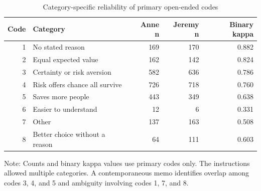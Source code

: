 \begin{table}[H]
\centering
\caption{\label{tab:open-ended-categories}Category-specific reliability of primary open-ended codes}
\centering
\fontsize{9}{11}\selectfont
\begin{threeparttable}
\begin{tabular}[t]{rlrrr}
\toprule
Code & Category & Anne n & Jeremy n & Binary kappa\\
\midrule
1 & No stated reason & 169 & 170 & 0.882\\
2 & Equal expected value & 162 & 142 & 0.824\\
3 & Certainty or risk aversion & 582 & 636 & 0.786\\
4 & Risk offers chance all survive & 726 & 718 & 0.760\\
5 & Saves more people & 443 & 349 & 0.638\\
6 & Easier to understand & 12 & 6 & 0.331\\
7 & Other & 137 & 163 & 0.508\\
8 & Better choice without a reason & 64 & 111 & 0.603\\
\bottomrule
\end{tabular}
\begin{tablenotes}[para]
\item Note: Counts and binary kappa values use primary codes only. The instructions allowed multiple categories. A contemporaneous memo identifies overlap among codes 3, 4, and 5 and ambiguity involving codes 1, 7, and 8.
\end{tablenotes}
\end{threeparttable}
\end{table}
